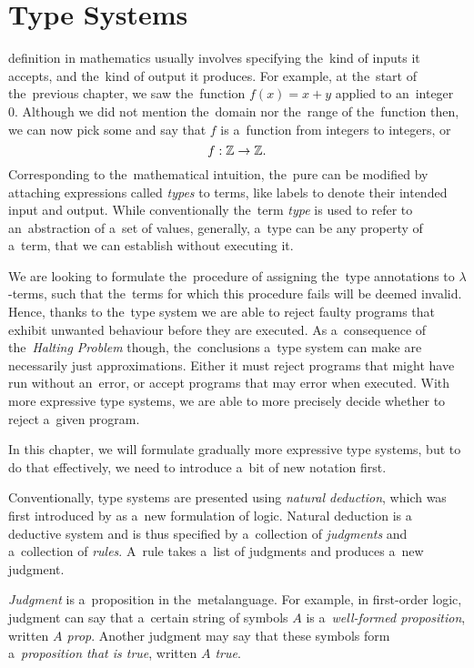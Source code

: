 \chapter{Type Systems}\label{cha:typesystems}

 definition in mathematics usually involves
specifying the~kind of inputs it accepts, and the~kind of output it produces.
For example, at the~start of the~previous chapter, we saw the~function $f(x) =
x + y$ applied to an~integer 0. Although we did not mention the~domain nor
the~range of the~function then, we can now pick some and say that $f$ is
a~function from integers to integers, or
\[
  f: \mathbb{Z} \to \mathbb{Z}.
\]
Corresponding to the~mathematical intuition, the~pure \lc can be modified by
attaching expressions called \emph{types} to terms, like labels to denote their
intended input and output. While conventionally the~term \emph{type} is used to
refer to an~abstraction of a~set of values, generally, a~type can be any
property of a~term, that we can establish without executing it.

We are looking to formulate the~procedure of assigning the~type annotations to
$\lambda$-terms, such that the~terms for which this procedure fails will be
deemed invalid. Hence, thanks to the~type system we are able to reject faulty
programs that exhibit unwanted behaviour before they are executed.
As a~consequence of the~\emph{Halting Problem} though, the~conclusions a~type
system can make are necessarily just approximations. Either it must reject
programs that might have run without an~error, or accept programs that may error
when executed. With more expressive type systems, we are able to more precisely
decide whether to reject a~given program.

In this chapter, we will formulate gradually more expressive type systems,
but to do that effectively, we need to introduce a~bit of new notation first.

\label{sec:natural_deduction}

Conventionally, type systems are presented using \emph{natural deduction}, which
was first introduced by \citet{gentzen_1935} as a~new formulation of logic.
Natural deduction is a deductive system and is thus specified by a~collection of
\emph{judgments} and a~collection of \emph{rules}. A~rule takes a~list of
judgments and produces a~new judgment.

\emph{Judgment} is a~proposition in the~metalanguage. For example, in
first-order logic, judgment can say that a~certain string of symbols $A$ is
a~\emph{well-formed proposition}, written \emph{$A$ prop}. Another judgment may
say that these symbols form a~\emph{proposition that is true}, written
\emph{$A$ true}.

